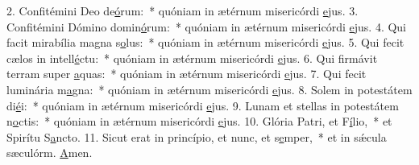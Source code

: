 2. Confitémini Deo de\uline{ó}rum:~* quóniam in ætérnum misericórdi \uline{e}jus.
3. Confitémini Dómino domin\uline{ó}rum:~* quóniam in ætérnum misericórdi \uline{e}jus.
4. Qui facit mirabília magna s\uline{o}lus:~* quóniam in ætérnum misericórdi \uline{e}jus.
5. Qui fecit cælos in intell\uline{é}ctu:~* quóniam in ætérnum misericórdi \uline{e}jus.
6. Qui firmávit terram super \uline{a}quas:~* quóniam in ætérnum misericórdi \uline{e}jus.
7. Qui fecit luminária m\uline{a}gna:~* quóniam in ætérnum misericórdi \uline{e}jus.
8. Solem in potestátem di\uline{é}i:~* quóniam in ætérnum misericórdi \uline{e}jus.
9. Lunam et stellas in potestátem n\uline{o}ctis:~* quóniam in ætérnum misericórdi \uline{e}jus.
10. Glória Patri, et F\uline{í}lio,~* et Spirítu S\uline{a}ncto.
11. Sicut erat in princípio, et nunc, et s\uline{e}mper,~* et in sǽcula sæculórm. \uline{A}men.
